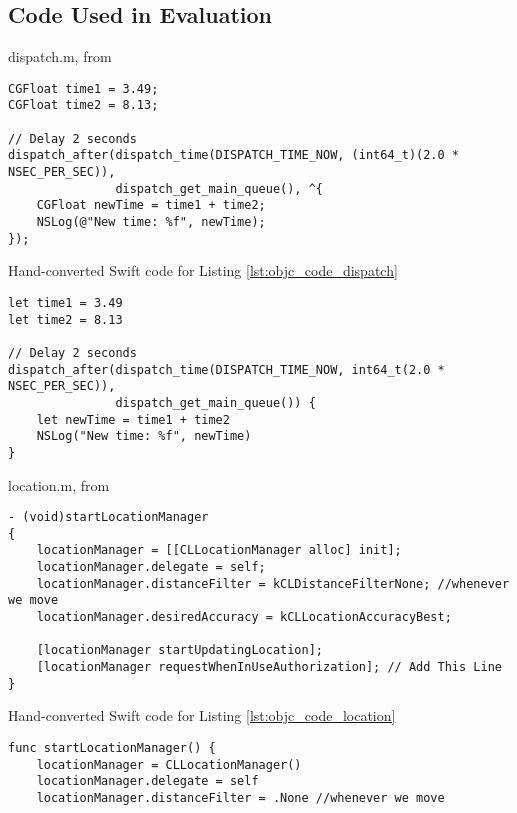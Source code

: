 \documentclass{sfuthesis}
\begin{document}
\begin{appendices}

\chapter{Code Used in Evaluation}\label{chap:evaluationcode}

\begin{listing}
\caption{dispatch.m, from \cite{so4139219}}
\label{lst:objc_code_dispatch}
\begin{verbatim}
CGFloat time1 = 3.49;
CGFloat time2 = 8.13;

// Delay 2 seconds
dispatch_after(dispatch_time(DISPATCH_TIME_NOW, (int64_t)(2.0 * NSEC_PER_SEC)),
               dispatch_get_main_queue(), ^{
    CGFloat newTime = time1 + time2;
    NSLog(@"New time: %f", newTime);
});
\end{verbatim}
\end{listing}

\begin{listing}
\caption{Hand-converted Swift code for Listing \ref{lst:objc_code_dispatch}}
\begin{verbatim}
let time1 = 3.49
let time2 = 8.13

// Delay 2 seconds
dispatch_after(dispatch_time(DISPATCH_TIME_NOW, int64_t(2.0 * NSEC_PER_SEC)), 
               dispatch_get_main_queue()) {
    let newTime = time1 + time2
    NSLog("New time: %f", newTime)
}
\end{verbatim}
\end{listing}

\begin{listing}
\caption{location.m, from \cite{so24062509}}
\label{lst:objc_code_location}
\begin{verbatim}
- (void)startLocationManager
{
    locationManager = [[CLLocationManager alloc] init];
    locationManager.delegate = self;
    locationManager.distanceFilter = kCLDistanceFilterNone; //whenever we move
    locationManager.desiredAccuracy = kCLLocationAccuracyBest;

    [locationManager startUpdatingLocation];
    [locationManager requestWhenInUseAuthorization]; // Add This Line
}
\end{verbatim}
\end{listing}

\begin{listing}
\caption{Hand-converted Swift code for Listing \ref{lst:objc_code_location}}
\begin{verbatim}
func startLocationManager() {
    locationManager = CLLocationManager()
    locationManager.delegate = self
    locationManager.distanceFilter = .None //whenever we move


\end{verbatim}
\end{listing}
\end{appendices}
\end{document}
